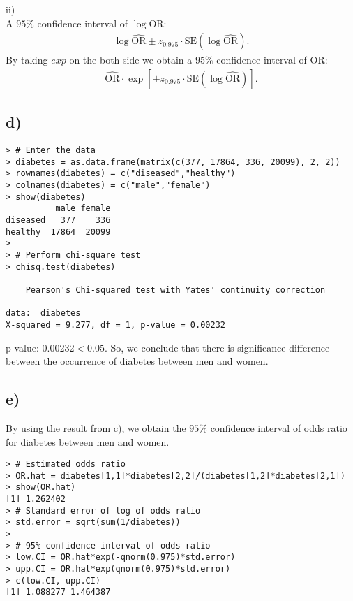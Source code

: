 \documentclass[a4paper]{article}
\begin{document}
ii)\\
A $95\%$ confidence interval of $\log\mathrm{OR}$:
\begin{align*}
\log\widehat{\mathrm{OR}} \pm z_{0.975}\cdot\mathrm{SE}\left(\log\widehat{\mathrm{OR}}\right).
\end{align*}
By taking $exp$ on the both side we obtain a $95\%$ confidence interval of $\mathrm{OR}$:
\begin{align*}
\widehat{\mathrm{OR}} \cdot \exp\left[\pm z_{0.975}\cdot\mathrm{SE}\left(\log\widehat{\mathrm{OR}}\right)\right].
\end{align*}

\vspace{\baselineskip}
\subsection{d)}
\begin{lstlisting}
> # Enter the data
> diabetes = as.data.frame(matrix(c(377, 17864, 336, 20099), 2, 2))
> rownames(diabetes) = c("diseased","healthy")
> colnames(diabetes) = c("male","female")
> show(diabetes)
          male female
diseased   377    336
healthy  17864  20099
> 
> # Perform chi-square test
> chisq.test(diabetes)

	Pearson's Chi-squared test with Yates' continuity correction

data:  diabetes
X-squared = 9.277, df = 1, p-value = 0.00232
\end{lstlisting}

p-value: $0.00232 < 0.05$. So, we conclude that there is significance difference between the occurrence of diabetes between men and women.


\vspace{\baselineskip}
\subsection{e)}
By using the result from c), we obtain the $95\%$ confidence interval of odds ratio for diabetes between men and women.

\begin{lstlisting}
> # Estimated odds ratio
> OR.hat = diabetes[1,1]*diabetes[2,2]/(diabetes[1,2]*diabetes[2,1])
> show(OR.hat)
[1] 1.262402
> # Standard error of log of odds ratio
> std.error = sqrt(sum(1/diabetes))
> 
> # 95% confidence interval of odds ratio
> low.CI = OR.hat*exp(-qnorm(0.975)*std.error)
> upp.CI = OR.hat*exp(qnorm(0.975)*std.error)
> c(low.CI, upp.CI)
[1] 1.088277 1.464387
\end{lstlisting}
\end{document}
